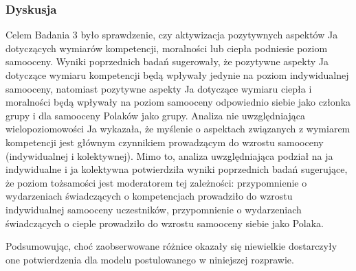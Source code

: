 \documentclass[man]{apa6}
\begin{document}

\subsubsection{Dyskusja}
Celem Badania 3 było sprawdzenie, czy aktywizacja pozytywnych aspektów Ja dotyczących wymiarów kompetencji, moralności lub ciepła podniesie poziom samooceny. Wyniki poprzednich badań sugerowały, że pozytywne aspekty Ja dotyczące wymiaru kompetencji będą wpływały jedynie na poziom indywidualnej samooceny, natomiast pozytywne aspekty Ja dotyczące wymiaru ciepła i moralności będą wpływały na poziom samooceny odpowiednio siebie jako członka grupy i dla samooceny Polaków jako grupy. Analiza nie uwzględniająca wielopoziomowości Ja wykazała, że myślenie o aspektach związanych z wymiarem kompetencji jest głównym czynnikiem prowadzącym do wzrostu samooceny (indywidualnej i kolektywnej). Mimo to, analiza uwzględniająca podział na ja indywidualne i ja kolektywna potwierdziła wyniki poprzednich badań sugerujące, że poziom tożsamości jest moderatorem tej zależności: przypomnienie o wydarzeniach świadczących o kompetencjach prowadziło do wzrostu indywidualnej samooceny uczestników, przypomnienie o wydarzeniach świadczących o cieple prowadziło do wzrostu samooceny siebie jako Polaka.

Podsumowując, choć zaobserwowane różnice okazały się niewielkie dostarczyły one potwierdzenia dla modelu postulowanego w niniejszej rozprawie.
\end{document}
